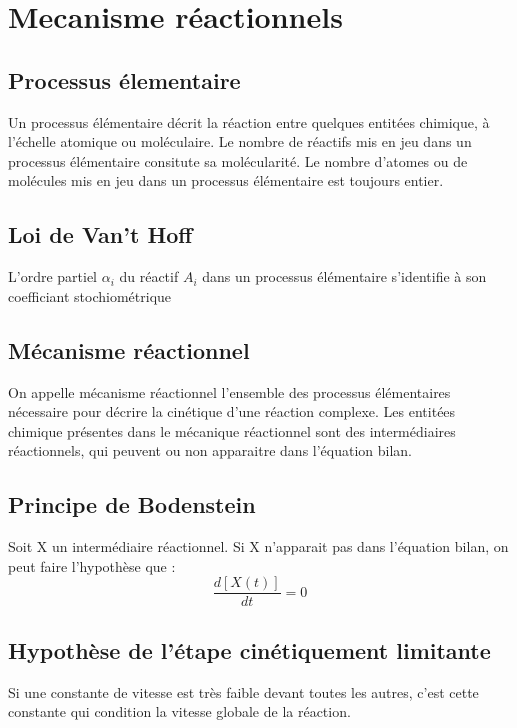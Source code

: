 
\chapter{Mecanisme réactionnels}
\section{Processus élementaire}
\begin{de}
Un processus élémentaire décrit la réaction entre quelques entitées chimique, à l'échelle atomique ou moléculaire. Le nombre de réactifs mis en jeu dans un processus élémentaire consitute sa molécularité. Le nombre d'atomes ou de molécules mis en jeu dans un processus élémentaire est toujours entier.
\end{de}
\section{Loi de Van't Hoff}
\begin{loi}
L'ordre partiel $\alpha_i$ du réactif $A_i$ dans un processus élémentaire s'identifie à son coefficiant stochiométrique
\end{loi}
\section{Mécanisme réactionnel}
\begin{de}
On appelle mécanisme réactionnel l'ensemble des processus élémentaires nécessaire pour décrire la cinétique d'une réaction complexe. Les entitées chimique présentes dans le mécanique réactionnel sont des intermédiaires réactionnels, qui peuvent ou non apparaitre dans l'équation bilan.
\end{de}
\section{Principe de Bodenstein}
\begin{de}
Soit X un intermédiaire réactionnel. Si X n'apparait pas dans l'équation bilan, on peut faire l'hypothèse que : $$\dfrac{d[X(t)]}{dt} = 0$$
\end{de}
\section{Hypothèse de l'étape cinétiquement limitante}
\begin{de}
Si une constante de vitesse est très faible devant toutes les autres, c'est cette constante qui condition la vitesse globale de la réaction.
\end{de}
